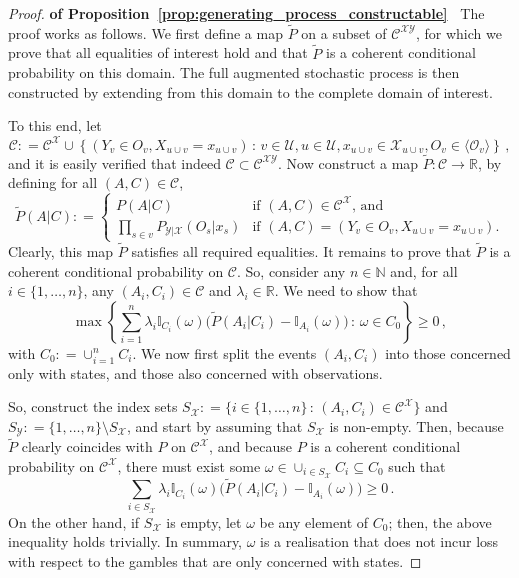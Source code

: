 \documentclass[twoside,11pt]{article}
\newcommand{\nats}{\mathbb{N}}
\newcommand{\reals}{\mathbb{R}}
\newcommand{\states}{\mathcal{X}}
\newcommand{\observs}{\mathcal{Y}}
\newcommand{\ind}[1]{\mathbb{I}_{#1}}
\newcommand{\coloneqq}{:\!=}
\begin{document}
\begin{proof}{\bf of Proposition~\ref{prop:generating_process_constructable}~}
The proof works as follows. We first define a map $\tilde{P}$ on a subset of $\mathcal{C}^{\states\observs}$, for which we prove that all equalities of interest hold and that $\tilde{P}$ is a coherent conditional probability on this domain. The full augmented stochastic process is then constructed by extending from this domain to the complete domain of interest.

To this end, let
\begin{equation*}
\mathcal{C} \coloneqq \mathcal{C}^\states \cup \left\{(Y_v\in O_v,X_{u\cup v}=x_{u\cup v})\,:\,v\in\mathcal{U},u\in\mathcal{U},x_{u\cup v}\in\states_{u\cup v}, O_v\in\langle\mathcal{O}_v\rangle \right\}\,,
\end{equation*}
and it is easily verified that indeed $\mathcal{C}\subset \mathcal{C}^{\states\observs}$. Now construct a map $\tilde{P}:\mathcal{C}\to\reals$, by defining for all $(A,C)\in\mathcal{C}$,
\begin{equation*}
\tilde{P}(A\vert C) \coloneqq \left\{\begin{array}{ll}
P(A\vert C) & \text{if $(A,C)\in\mathcal{C}^\states$, and} \\
\prod_{s\in v} P_{\observs\vert\states}(O_s\vert x_s) & \text{if $(A,C)=(Y_v\in O_v, X_{u\cup v}=x_{u\cup v})$.}
\end{array}\right.
\end{equation*}
Clearly, this map $\tilde{P}$ satisfies all required equalities. It remains to prove that $\tilde{P}$ is a coherent conditional probability on $\mathcal{C}$. So, consider any $n\in\nats$ and, for all $i\in\{1,\ldots,n\}$, any $(A_i,C_i)\in\mathcal{C}$ and $\lambda_i\in\reals$. We need to show that
\begin{equation*}
\max\left\{ \sum_{i=1}^n\lambda_i\ind{C_i}(\omega)\bigl(\tilde{P}(A_i\vert C_i) - \ind{A_i}(\omega)\bigr)\,:\,\omega\in C_0\right\} \geq 0\,,
\end{equation*}
with $C_0\coloneqq \cup_{i=1}^n C_i$. We now first split the events $(A_i,C_i)$ into those concerned only with states, and those also concerned with observations. 

So, construct the index sets $S_\states\coloneqq \bigl\{ i\in\{1,\ldots,n\}\,:\,(A_i,C_i)\in\mathcal{C}^\states \bigr\}$ and $S_\observs\coloneqq \{1,\ldots,n\}\setminus S_\states$, and start by assuming that $S_\states$ is non-empty. Then, because $\tilde{P}$ clearly coincides with $P$ on $\mathcal{C}^\states$, and because $P$ is a coherent conditional probability on $\mathcal{C}^\states$, there must exist some $\omega \in \cup_{i\in S_\states} C_i\subseteq C_0$ such that
\begin{equation*}
\sum_{i\in S_\states} \lambda_i\ind{C_i}(\omega)\bigl(\tilde{P}(A_i\vert C_i) - \ind{A_i}(\omega) \bigr) \geq 0\,.
\end{equation*}
On the other hand, if $S_\states$ is empty, let $\omega$ be any element of $C_0$; then, the above inequality holds trivially. In summary, $\omega$ is a realisation that does not incur loss with respect to the gambles that are only concerned with states.


\end{proof}
\end{document}
